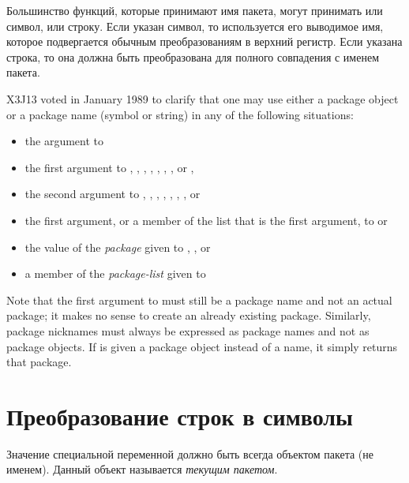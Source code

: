 Большинство функций, которые принимают имя пакета, могут принимать или символ,
или строку. Если указан символ, то используется его выводимое имя, которое
подвергается обычным преобразованиям в верхний регистр. Если указана строка, то она
должна быть преобразована для полного совпадения с именем пакета. 

\begin{new}
X3J13 voted in January 1989
to clarify that one may use either a package object or
a package name (symbol or string) in any of the following
situations:
\begin{itemize}
\item the  argument to 
\item the first argument to , ,
, ,
, ,
, or ,

\item the second argument to , ,
, , , , ,
or 
\item the first argument, or a member of the list that is the first argument,
to  or 
\item the value of the \emph{package} given to ,
, or 
\item a member of the \emph{package-list} given to 
\end{itemize}
Note that the first argument to  must still be a package
name and not an actual package; it makes no sense to create an already
existing package.  Similarly, package nicknames must always be expressed
as package names and not as package objects.  If  is
given a package object instead of a name, it simply returns that package.
\end{new}

\section{Преобразование строк в символы}
\label{STRING-TO-SYMBOL-SECTION}

Значение специальной переменной  должно быть всегда объектом
пакета (не именем). Данный объект называется \emph{текущим пакетом}.


